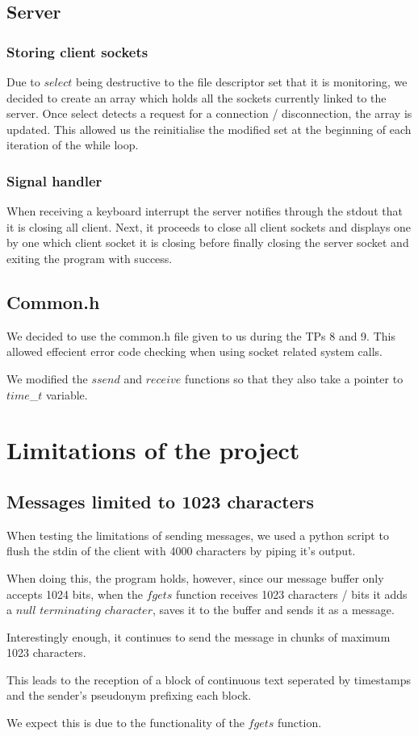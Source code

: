 \documentclass[utf8]{article}
\begin{document}
\subsection{Server}

\subsubsection{Storing client sockets}
Due to $select$ being destructive to the file descriptor set that it is monitoring, we decided to create an array which holds all the sockets currently linked to the server. Once select detects a request for a connection / disconnection, the array is updated. This allowed us the reinitialise the modified set at the beginning of each iteration of the while loop.

\subsubsection{Signal handler}
When receiving a keyboard interrupt the server notifies through the stdout that it is closing all client. Next, it proceeds to close all client sockets and displays one by one which client socket it is closing before finally closing the server socket and exiting the program with success.

\subsection{Common.h}

We decided to use the common.h file given to us during the TPs 8 and 9. This allowed effecient error code checking when using socket related system calls.\par

We modified the $ssend$ and $receive$ functions so that they also take a pointer to $time$\_$t$ variable. 
\section{Limitations of the project}

\subsection{Messages limited to 1023 characters}
When testing the limitations of sending messages, we used a python script to flush the stdin of the client with 4000 characters by piping it's output. \par 
When doing this, the program holds, however, since our message buffer only accepts 1024 bits, when the $fgets$ function receives 1023 characters / bits it adds a $null$ $terminating$ $character$, saves it to the buffer and sends it as a message. \par
Interestingly enough, it continues to send the message in chunks of maximum 1023 characters. \par
This leads to the reception of a block of continuous text seperated by timestamps and the sender's pseudonym prefixing each block. \par
We expect this is due to the functionality of the $fgets$ function.
\end{document}
